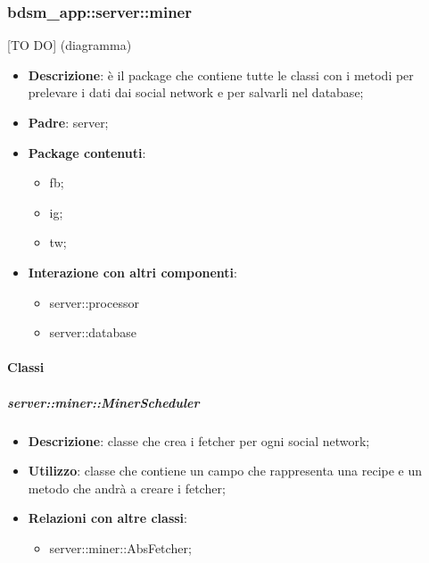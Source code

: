 


\subsubsection{bdsm\_app::server::miner} %
\label{ssub:bdsm_app_server_miner}
[TO DO] (diagramma) \newline \newline

\begin{itemize}
  \item \textbf{Descrizione}: è il package che contiene tutte le classi con i metodi per prelevare i dati dai social network e per salvarli nel database;
  \item \textbf{Padre}: server;
  \item \textbf{Package contenuti}:
  	\begin{itemize}
  		\item fb;
  		\item ig;
  		\item tw;
  	\end{itemize}
  \item \textbf{Interazione con altri componenti}:
  	\begin{itemize}
  		\item server::processor
  		\item server::database
  	\end{itemize}
\end{itemize}

\paragraph{Classi} %
		\subparagraph{server::miner::MinerScheduler} %
		\label{subp:server_miner_MinerScheduler}
			\begin{itemize}
				\item \textbf{Descrizione}: classe che crea i fetcher per ogni social network;
				\item \textbf{Utilizzo}: classe che contiene un campo che rappresenta una recipe e un metodo che andrà a creare i fetcher;
				\item \textbf{Relazioni con altre classi}:
					\begin{itemize}
						\item server::miner::AbsFetcher;
					\end{itemize}
			\end{itemize}
		
